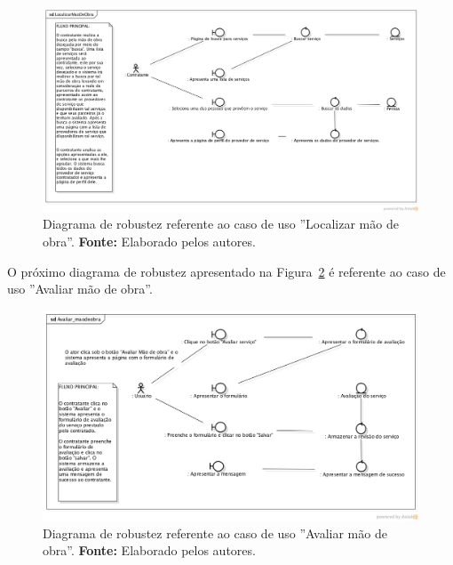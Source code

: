 \captionsetup[figure]{list=no}
\begin{figure}[h!]
	\centerline{\includegraphics[scale=0.35]{./imagens/apendices/diagrama-robustez-localizar-mao-de-obra.png}}
	\caption[Diagrama de robustez referente ao caso de uso ''Localizar mão de obra''.]
	{Diagrama de robustez referente ao caso de uso ''Localizar mão de obra''. \textbf{Fonte:} Elaborado pelos autores.}
	\label{fig:ap1:diagrama_robustez_localizar_mao_de_obra}
\end{figure}

O próximo diagrama de robustez apresentado na Figura~\ref{fig:ap1:diagrama_robustez_avaliar_mao_de_obra} é referente ao caso de uso ''Avaliar mão de obra''.

\newpage
\captionsetup[figure]{list=no}
\begin{figure}[h!]
	\centerline{\includegraphics[scale=0.43]{./imagens/apendices/diagrama-robustez-avaliar-mao-de-obra.png}}
	\caption[Diagrama de robustez referente ao caso de uso ''Avaliar mão de obra''.]
	{Diagrama de robustez referente ao caso de uso ''Avaliar mão de obra''. \textbf{Fonte:} Elaborado pelos autores.}
	\label{fig:ap1:diagrama_robustez_avaliar_mao_de_obra}
\end{figure}

